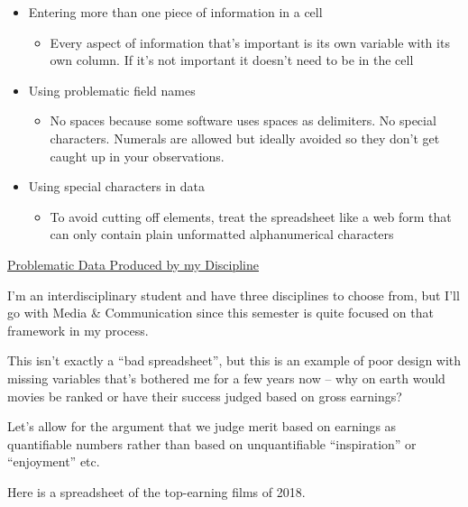 \documentclass[12pt]{article}
\begin{document}
\begin{itemize}
\begin{itemize}
    \end{itemize}
    \item Entering more than one piece of information in a cell
    \begin{itemize}
        \item Every aspect of information that’s important is its own variable with its own column. If it’s not important it doesn’t need to be in the cell
    \end{itemize}
    \item Using problematic field names
    \begin{itemize}
        \item No spaces because some software uses spaces as delimiters. No special characters. Numerals are allowed but ideally avoided so they don’t get caught up in your observations. 
    \end{itemize}
    \item Using special characters in data
    \begin{itemize}
        \item To avoid cutting off elements, treat the spreadsheet like a web form that can only contain plain unformatted alphanumerical characters
    \end{itemize}
\end{itemize}


\underline{Problematic Data Produced by my Discipline}

\vspace{1em}
I’m an interdisciplinary student and have three disciplines to choose from, but I’ll go with Media & Communication since this semester is quite focused on that framework in my process.

This isn’t exactly a “bad spreadsheet”, but this is an example of poor design with missing variables that’s bothered me for a few years now – why on earth would movies be ranked or have their success judged based on gross earnings? 

Let’s allow for the argument that we judge merit based on earnings as quantifiable numbers rather than based on unquantifiable “inspiration” or “enjoyment” etc.
 
Here is a spreadsheet of the top-earning films of 2018. 
\end{document}
